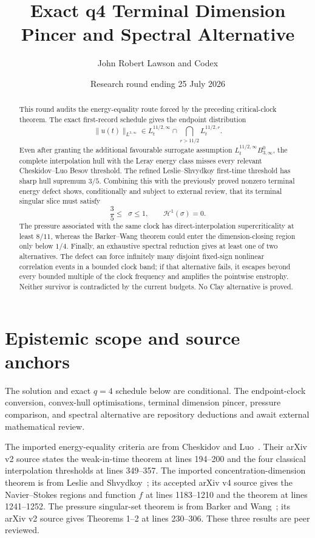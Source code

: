 \documentclass[11pt]{article}
\title{Exact q4 Terminal Dimension Pincer and Spectral Alternative}
\author{John Robert Lawson and Codex}
\date{Research round ending 25 July 2026}
\theoremstyle{remark}
\newcommand{\HH}{\mathcal H}
\DeclareMathOperator{\dimH}{dim_{\mathrm H}}
\begin{document}
\maketitle

\begin{abstract}
This round audits the energy-equality route forced by the preceding
critical-clock theorem.  The exact first-record schedule gives the
endpoint distribution
\[
 \|u(t)\|_{L^{3,\infty}}
 \in L_t^{11/2,\infty}
 \cap\bigcap_{r>11/2}L_t^{11/2,r}.
\]
Even after granting the additional favourable surrogate assumption
\(L_t^{11/2,\infty}B^0_{3,\infty}\), the complete interpolation hull
with the Leray energy class misses every relevant
Cheskidov--Luo Besov threshold.  The refined Leslie--Shvydkoy
first-time threshold has sharp hull supremum \(3/5\).  Combining this
with the previously proved nonzero terminal energy defect shows,
conditionally and subject to external review, that its terminal
singular slice must satisfy
\[
 \frac35\leq\dimH\sigma\leq1,
 \qquad \HH^1(\sigma)=0.
\]
The pressure associated with the same clock has direct-interpolation
supercriticality at least \(8/11\), whereas the Barker--Wang theorem
could enter the dimension-closing region only below \(1/4\).
Finally, an exhaustive spectral reduction gives at least one of two
alternatives.  The defect can force infinitely many disjoint fixed-sign
nonlinear correlation events in a bounded clock band; if that alternative
fails, it escapes beyond every bounded multiple of the clock frequency and
amplifies the pointwise enstrophy.
Neither survivor is contradicted by the current budgets.  No Clay
alternative is proved.
\end{abstract}

\section{Epistemic scope and source anchors}

The solution and exact \(q=4\) schedule below are conditional.  The
endpoint-clock conversion, convex-hull optimisations, terminal
dimension pincer, pressure comparison, and spectral alternative are
repository deductions and await external mathematical review.

The imported energy-equality criteria are from Cheskidov and
Luo~\cite{CL20}.  Their arXiv v2 source states the weak-in-time theorem
at lines 194--200 and the four classical interpolation thresholds at
lines 349--357.  The imported concentration-dimension theorem is from
Leslie and Shvydkoy~\cite{LS18}; its accepted arXiv v4 source gives the
Navier--Stokes regions and function \(f\) at lines 1183--1210 and the
theorem at lines 1241--1252.  The pressure singular-set theorem is from
Barker and Wang~\cite{BW23}; its arXiv v2 source gives Theorems 1--2 at
lines 230--306.  These three results are peer reviewed.
\end{document}
